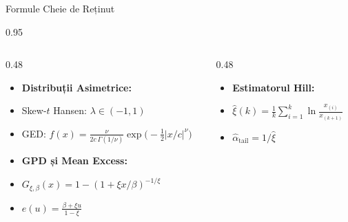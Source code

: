 \documentclass[9pt, aspectratio=169, t]{beamer}
\begin{document}
\begin{frame}{Formule Cheie de Reținut}
    \begin{cminipage}{0.95\textwidth}
    \begin{columns}[T]
        \begin{column}{0.48\textwidth}
            \begin{itemize}\setlength{\itemsep}{0pt}
                \item \textbf{Distribuții Asimetrice:}
            \end{itemize}
            \begin{itemize}\setlength{\itemsep}{0pt}
                \item Skew-$t$ Hansen: $\lambda \in (-1,1)$
                \item GED: $f(x) = \frac{\nu}{2c\,\Gamma(1/\nu)}\exp\!\bigl(-\tfrac{1}{2}|x/c|^\nu\bigr)$
            \end{itemize}

            \vspace{0.3cm}

            \begin{itemize}\setlength{\itemsep}{0pt}
                \item \textbf{GPD și Mean Excess:}
            \end{itemize}
            \begin{itemize}\setlength{\itemsep}{0pt}
                \item $G_{\xi,\beta}(x) = 1 - (1 + \xi x/\beta)^{-1/\xi}$
                \item $e(u) = \frac{\beta + \xi u}{1 - \xi}$
            \end{itemize}
        \end{column}
        \begin{column}{0.48\textwidth}
            \begin{itemize}\setlength{\itemsep}{0pt}
                \item \textbf{Estimatorul Hill:}
            \end{itemize}
            \begin{itemize}\setlength{\itemsep}{0pt}
                \item $\hat{\xi}(k) = \frac{1}{k}\sum_{i=1}^{k}\ln\frac{x_{(i)}}{x_{(k+1)}}$
                \item $\hat{\alpha}_{\text{tail}} = 1/\hat{\xi}$
            \end{itemize}

            \vspace{0.3cm}


\end{column}
\end{columns}
\end{cminipage}
\end{frame}
\end{document}
